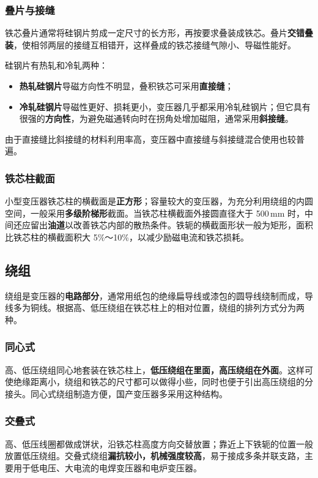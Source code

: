 \subsubsection{叠片与接缝}
铁芯叠片通常将硅钢片剪成一定尺寸的长方形，再按要求叠装成铁芯。叠片\textbf{交错叠装}，使相邻两层的接缝互相错开，这样叠成的铁芯接缝气隙小、导磁性能好。

硅钢片有热轧和冷轧两种：
\begin{itemize}
  \item \textbf{热轧硅钢片}导磁方向性不明显，叠积铁芯可采用\textbf{直接缝}；
  \item \textbf{冷轧硅钢片}导磁性更好、损耗更小，变压器几乎都采用冷轧硅钢片；但它具有很强的\textbf{方向性}，为避免磁通转向时在拐角处增加磁阻，通常采用\textbf{斜接缝}。
\end{itemize}
由于直接缝比斜接缝的材料利用率高，变压器中直接缝与斜接缝混合使用也较普遍。

\subsubsection{铁芯柱截面}
小型变压器铁芯柱的横截面是\textbf{正方形}；容量较大的变压器，为充分利用绕组的内圆空间，一般采用\textbf{多级阶梯形}截面。当铁芯柱横截面外接圆直径大于 500\,mm 时，中间还应留出\textbf{油道}以改善铁芯内部的散热条件。铁轭的横截面形状一般为矩形，面积比铁芯柱的横截面积大 5\%～10\%，以减少励磁电流和铁芯损耗。

\subsection{绕组}
绕组是变压器的\textbf{电路部分}，通常用纸包的绝缘扁导线或漆包的圆导线绕制而成，导线多为铜线。根据高、低压绕组在铁芯柱上的相对位置，绕组的排列方式分为两种。

\subsubsection{同心式}
高、低压绕组同心地套装在铁芯柱上，\textbf{低压绕组在里面，高压绕组在外面}。这样可使绝缘距离小，绕组和铁芯的尺寸都可以做得小些，同时也便于引出高压绕组的分接头。同心式绕组制造方便，国产变压器多采用这种结构。

\subsubsection{交叠式}
高、低压线圈都做成饼状，沿铁芯柱高度方向交替放置；靠近上下铁轭的位置一般放置低压绕组。交叠式绕组\textbf{漏抗较小，机械强度较高}，易于接成多条并联支路，主要用于低电压、大电流的电焊变压器和电炉变压器。

